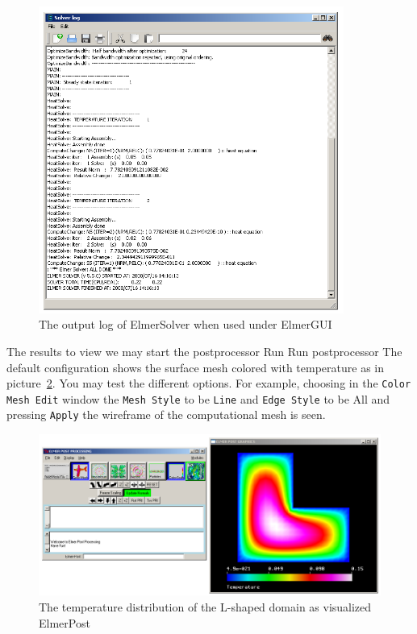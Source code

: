 \begin{figure}
\begin{center}
\includegraphics[width=100mm]{Tangle_com}
\caption{The output log of ElmerSolver when used under ElmerGUI}\label{fg:log1}
\end{center}
\end{figure}


The results to view we may start the postprocessor 
\ttbegin
Run
  Run postprocessor
\ttend
The default configuration shows the surface mesh colored with temperature as in picture~\ref{fg:post1}. You may test 
the different options. For example, choosing in the \texttt{Color Mesh Edit} window the 
\texttt{Mesh Style} to be \texttt{Line} and
\texttt{Edge Style} to be {All} and pressing \texttt{Apply} the wireframe of the computational 
mesh is seen. 


\begin{figure}
\begin{center}
\includegraphics[width=140mm]{Tangle_post}
\caption{The temperature distribution of the L-shaped domain as visualized ElmerPost}\label{fg:post1}
\end{center}
\end{figure}


